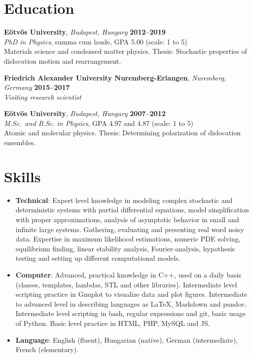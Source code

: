 \documentclass[10pt,USletter,sans]{moderncv}        %
\begin{document}
\makecvtitle
\section{Education}
\textbf{Eötvös University}, \emph{Budapest, Hungary}  \hfill \textbf{2012--2019}\\
\emph{PhD in Physics}, summa cum laude, GPA 5.00 (scale: 1 to 5)\\
Materials science and condensed matter physics. Thesis: Stochastic properties of dislocation motion and rearrangement.  %

\vspace{4pt}
\textbf{Friedrich Alexander University Nuremberg-Erlangen}, \emph{Nuremberg, Germany} \hfill \textbf{2015--2017}\\
\emph{Visiting research scientist}

\vspace{4pt}
\textbf{Eötvös University}, \emph{Budapest, Hungary}  \hfill \textbf{2007--2012}\\
\emph{M.Sc.\ and B.Sc. in Physics}, GPA 4.97 and 4.87 (scale: 1 to 5)\\
Atomic and molecular physics. Thesis: Determining polarization of dislocation ensembles.

\section{Skills}
\begin{itemize}
\item \textbf{Technical}: Expert level knowledge in modeling complex stochastic and deterministic systems with partial differential equations, model simplification with proper approximations, analysis of asymptotic behavior in small and infinite large systems. Gathering, evaluating and presenting real word noisy data. Expertise in maximum likelihood estimations, numeric PDE solving, equilibrium finding, linear stability analysis, Fourier-analysis, hypothesis testing and setting up different computational models.
\vspace{4pt}
\item \textbf{Computer}: Advanced, practical knowledge in C++, used on a daily basis (classes, templates, lambdas, STL and other libraries). Intermediate level scripting practice in Gnuplot to visualize data and plot figures. Intermediate to advanced level in describing languages as LaTeX, Markdown and pandoc. Intermediate level scripting in bash, regular expressions and git, basic usage of Python. Basic level practice in HTML, PHP, MySQL and JS.
\vspace{4pt}
\item \textbf{Language}: English (fluent), Hungarian (native), German (intermediate), French (elementary).
\end{itemize}
\end{document}
